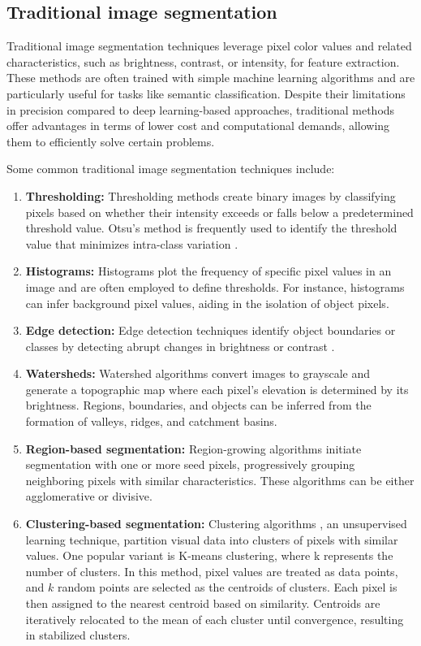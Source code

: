 \subsection{Traditional image segmentation}
Traditional image segmentation techniques leverage pixel color values and related characteristics, such as brightness, contrast, or intensity, for feature extraction. These methods are often trained with simple machine learning algorithms and are particularly useful for tasks like semantic classification. Despite their limitations in precision compared to deep learning-based approaches, traditional methods offer advantages in terms of lower cost and computational demands, allowing them to efficiently solve certain problems.

Some common traditional image segmentation techniques include:
\begin{enumerate}
  \item \textbf{Thresholding:} Thresholding methods create binary images by classifying pixels based on whether their intensity exceeds or falls below a predetermined threshold value. Otsu's method is frequently used to identify the threshold value that minimizes intra-class variation \cite{otsu1979}.
  \item \textbf{Histograms:} Histograms plot the frequency of specific pixel values in an image and are often employed to define thresholds. For instance, histograms can infer background pixel values, aiding in the isolation of object pixels.
  \item \textbf{Edge detection:} Edge detection techniques identify object boundaries or classes by detecting abrupt changes in brightness or contrast \cite{Edgedet1986}.
  \item \textbf{Watersheds:} Watershed algorithms \cite{Watershed1991} convert images to grayscale and generate a topographic map where each pixel's elevation is determined by its brightness. Regions, boundaries, and objects can be inferred from the formation of valleys, ridges, and catchment basins.
  \item \textbf{Region-based segmentation:} Region-growing algorithms \cite{RCNN2016} initiate segmentation with one or more seed pixels, progressively grouping neighboring pixels with similar characteristics. These algorithms can be either agglomerative or divisive.
  \item \textbf{Clustering-based segmentation:} Clustering algorithms \cite{ClusteringSeg1979}, an unsupervised learning technique, partition visual data into clusters of pixels with similar values. One popular variant is K-means clustering, where k represents the number of clusters. In this method, pixel values are treated as data points, and $k$ random points are selected as the centroids of clusters. Each pixel is then assigned to the nearest centroid based on similarity. Centroids are iteratively relocated to the mean of each cluster until convergence, resulting in stabilized clusters.
\end{enumerate}

